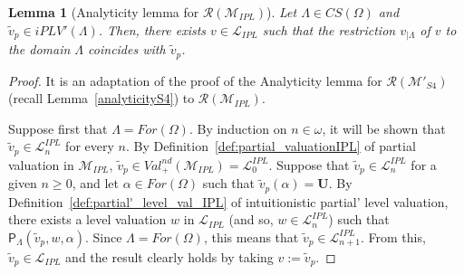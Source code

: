 \documentclass[12pt]{article}
\newtheorem{lemma}[theorem]{Lemma}
\newcommand{\bU}{\mathbf{U}}
\begin{document}
\begin{lemma} [Analyticity lemma for $\mathcal{R}(\mathcal{M}_{IPL})$] \label{analyticityIPL} Let $\Lambda \in CS(\Omega)$ and  $\tilde v_p \in iPLV'(\Lambda)$. Then, there exists $v \in \mathcal{L}_{IPL}$ such that the restriction $v_{|\Lambda}$ of $v$ to the domain $\Lambda$ coincides with $\tilde v_p$.
\end{lemma}
\begin{proof} It is an adaptation of the proof of the Analyticity lemma for $\mathcal{R}(\mathcal{M}'_{S4})$ (recall Lemma~\ref{analyticityS4}) to $\mathcal{R}(\mathcal{M}_{IPL})$.

Suppose first that $\Lambda=For(\Omega)$.  By induction on $n \in \omega$, it will be shown that $\tilde v_p \in \mathcal{L}^{IPL}_n$ for every $n$. By Definition~\ref{def:partial_valuationIPL} of partial valuation in $\mathcal{M}_{IPL}$, $\tilde v_p \in Val^{nd}_+(\mathcal{M}_{IPL})= {\mathcal{L}}_0^{IPL}$. Suppose that $\tilde v_p \in \mathcal{L}^{IPL}_n$ for a given $n \geq 0$, and let $\alpha \in For(\Omega)$ such that $\tilde v_p(\alpha)=\bU$. By Definition~\ref{def:partial'_level_val_IPL} of intuitionistic partial' level valuation,  there exists a level valuation $w$ in $\mathcal{L}_{IPL}$ (and so, $w \in \mathcal{L}^{IPL}_n$) such that $\mathsf{P}_\Lambda(\tilde v_p,w,\alpha)$. Since  $\Lambda=For(\Omega)$, this means that  $\tilde v_p \in \mathcal{L}^{IPL}_{n+1}$. From this, $\tilde v_p \in \mathcal{L}_{IPL}$ and the result clearly holds by taking $v:=\tilde v_p$.


\end{proof}
\end{document}
